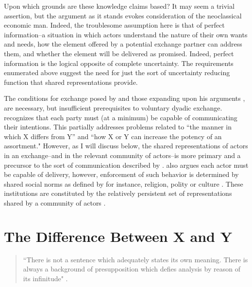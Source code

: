 Upon which grounds are these knowledge claims based? It may seem a trivial assertion, but the argument as it stands evokes consideration of the neoclassical economic man. Indeed, the troublesome assumption here is that of perfect information--a situation in which actors understand the nature of their own wants and needs, how the element offered by a potential exchange partner can address them, and whether the element will be delivered as promised. Indeed, perfect information is the logical opposite of complete uncertainty. The requirements enumerated above suggest the need for just the sort of uncertainty reducing function that shared representations provide. 

The conditions for exchange posed by \citet{alderson1965a} and those expanding upon his arguments \citep[e.g.][]{blalock1979, kotler1984, houston1987}, are necessary, but insufficient prerequisites to voluntary dyadic exchange. \citet{kotler1984} recognizes that each party must (at a minimum) be capable of communicating their intentions. This partially addresses problems related to ``the manner in which X differs from Y'' and ``how X or Y can increase the potency of an assortment." However, as I will discuss below, the shared representations of actors in an exchange--and in the relevant community of actors--is more primary and a precursor to the sort of communication described by \citet{kotler1984}. \citet{kotler1984} also argues each actor must be capable of delivery, however, enforcement of such behavior is determined by shared social norms \citep{granovetter1985} as defined by for instance, religion, polity or culture \citep{lusch2014}. These institutions are constituted by the relatively persistent set of representations shared by a community of actors \citep{denzau1994}.

\section{The Difference Between X and Y}
\begin{small}
\begin{quote}
``There is not a sentence which adequately states its own meaning. There is always a background of presupposition which defies analysis by reason of its infinitude" \citep[p. 699]{whitehead1951}.
\end{quote}
\end{small}

